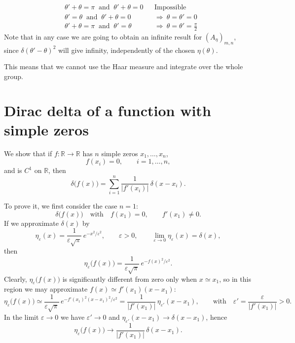 \documentclass[11pt]{article}
\newcommand{\R}{\mathbb{R}}
\begin{document}
\begin{align*}
  &\theta'+\theta=\pi\ \text{ and }\ \theta'+\theta=0 &&\text{Impossible}\\
  &\theta'=\theta\ \text{ and }\ \theta'+\theta=0 &&\Rightarrow\ \theta=\theta'=0\\
  &\theta'+\theta=\pi\ \text{ and }\ \theta'=\theta &&\Rightarrow\ \theta=\theta'=\tfrac{\pi}{2}
\end{align*}
Note that in any case we are going to obtain an infinite result for
$(A_\eta)_{m,n}$, since $\delta(\theta'-\theta)^2$ will give infinity, independently of
the chosen $\eta(\theta)$.

This means that we cannot use the Haar measure and integrate over the whole
group.



\section{Dirac delta of a function with simple zeros}
\label{app:1}

We show that if $f\colon\R\to\R$ has $n$ simple zeros $x_1,\dots,x_n$,
\[
  f(x_i)=0,\qquad i=1,\dots,n,
\]
and is $C^1$ on $\R$, then
\begin{equation}\label{eq:deltaf}
  \delta\bigl(f(x)\bigr)=\sum_{i=1}^{n}\frac{1}{|f'(x_i)|}\,\delta(x-x_i).
\end{equation}

To prove it, we first consider the case $n=1$:
\[
  \delta\bigl(f(x)\bigr)\quad\text{with}\quad f(x_1)=0,\qquad f'(x_1)\neq0.
\]
If we approximate $\delta(x)$ by
\[
  \eta_\varepsilon(x)=\frac{1}{\varepsilon\sqrt{\pi}}\,e^{-x^2/\varepsilon^2},
  \qquad \varepsilon>0,
  \qquad
  \lim_{\varepsilon\to0}\eta_\varepsilon(x)=\delta(x),
\]
then
\[
  \eta_\varepsilon\bigl(f(x)\bigr)=\frac{1}{\varepsilon\sqrt{\pi}}\,
  e^{-f(x)^2/\varepsilon^2}.
\]
Clearly, $\eta_\varepsilon\bigl(f(x)\bigr)$ is significantly different from
zero only when $x\simeq x_1$, so in this region we may approximate
$f(x)\simeq f'(x_1)(x-x_1)$:
\[
  \eta_\varepsilon\bigl(f(x)\bigr)\simeq\frac{1}{\varepsilon\sqrt{\pi}}\,
  e^{-f'(x_1)^2(x-x_1)^2/\varepsilon^2}
  =\frac{1}{|f'(x_1)|}\,\eta_{\varepsilon'}(x-x_1),
  \qquad\text{with}\quad \varepsilon'=\frac{\varepsilon}{|f'(x_1)|}>0.
\]
In the limit $\varepsilon\to0$ we have $\varepsilon'\to0$ and
$\eta_{\varepsilon'}(x-x_1)\to\delta(x-x_1)$, hence
\[
  \eta_\varepsilon\bigl(f(x)\bigr)\longrightarrow\frac{1}{|f'(x_1)|}\,\delta(x-x_1).
\]
\end{document}
